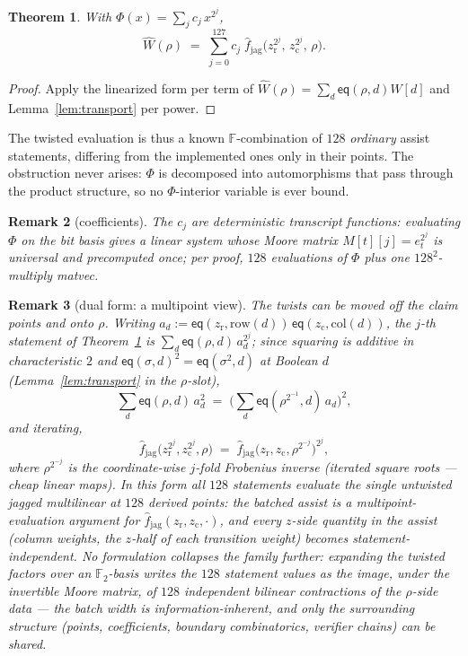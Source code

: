 \documentclass[11pt]{article}
\newcommand{\F}{\mathbb{F}}
\newcommand{\Ftwo}{\F_2}
\newcommand{\eq}{\mathsf{eq}}
\newcommand{\rowof}{\mathrm{row}}
\newcommand{\colof}{\mathrm{col}}
\newcommand{\fjag}{\hat f_{\mathrm{jag}}}
\newtheorem{theorem}{Theorem}
\newtheorem{remark}[theorem]{Remark}
\begin{document}
\begin{theorem}\label{thm:main}
With $\Phi(x) = \sum_j c_j\, x^{2^j}$,
\[
  \widehat W(\rho)
  \;=\;
  \sum_{j=0}^{127} c_j\;
  \fjag\bigl(z_{\mathrm r}^{2^j},\, z_{\mathrm c}^{2^j},\, \rho\bigr).
\]
\end{theorem}

\begin{proof}
Apply the linearized form per term of $\widehat W(\rho) = \sum_d
\eq(\rho,d) W[d]$ and Lemma~\ref{lem:transport} per power.
\end{proof}

The twisted evaluation is thus a known $\F$-combination of $128$
\emph{ordinary} assist statements, differing from the implemented ones
only in their points. The obstruction never
arises: $\Phi$ is decomposed into automorphisms that pass through the
product structure, so no $\Phi$-interior variable is ever bound.

\begin{remark}[coefficients]\label{rem:moore}
The $c_j$ are deterministic transcript functions: evaluating $\Phi$
on the bit basis gives a linear system whose Moore matrix
$M[t][j] = e_t^{2^j}$ is universal and precomputed once; per proof,
$128$ evaluations of $\Phi$ plus one $128^2$-multiply matvec.
\end{remark}

\begin{remark}[dual form: a multipoint view]\label{rem:dual}
The twists can be moved off the claim points and onto $\rho$. Writing
$a_d := \eq(z_{\mathrm r}, \rowof(d))\,\eq(z_{\mathrm c}, \colof(d))$,
the $j$-th statement of Theorem~\ref{thm:main} is
$\sum_d \eq(\rho, d)\, a_d^{2^j}$; since squaring is additive in
characteristic $2$ and $\eq(\sigma, d)^2 = \eq(\sigma^2, d)$ at
Boolean $d$ (Lemma~\ref{lem:transport} in the $\rho$-slot),
\[
  \textstyle\sum_d \eq(\rho, d)\, a_d^{2}
  \;=\;
  \bigl(\sum_d \eq(\rho^{2^{-1}}, d)\, a_d\bigr)^{2},
\]
and iterating,
\[
  \fjag\bigl(z_{\mathrm r}^{2^j}, z_{\mathrm c}^{2^j}, \rho\bigr)
  \;=\;
  \fjag\bigl(z_{\mathrm r}, z_{\mathrm c}, \rho^{2^{-j}}\bigr)^{2^j},
\]
where $\rho^{2^{-j}}$ is the coordinate-wise $j$-fold Frobenius
inverse (iterated square roots --- cheap linear maps). In this form
all $128$ statements evaluate the \emph{single untwisted} jagged
multilinear at $128$ derived points: the batched assist is a
multipoint-evaluation argument for $\fjag(z_{\mathrm r}, z_{\mathrm c},
\cdot)$, and every $z$-side quantity in the assist (column weights,
the $z$-half of each transition weight) becomes statement-independent.
No formulation collapses the family further: expanding the twisted
factors over an $\Ftwo$-basis writes the $128$ statement values as the
image, under the invertible Moore matrix, of $128$ independent
bilinear contractions of the $\rho$-side data --- the batch width is
information-inherent, and only the surrounding structure (points,
coefficients, boundary combinatorics, verifier chains) can be shared.
\end{remark}
\end{document}
